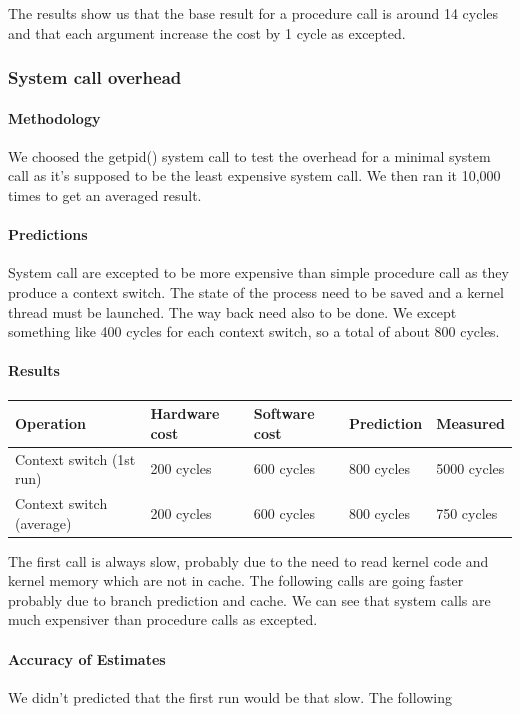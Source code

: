 The results show us that the base result for a procedure call is around 14
cycles and that each argument increase the cost by 1 cycle as excepted.

\subsubsection{System call overhead}
\paragraph{Methodology}
We choosed the getpid() system call to test the overhead for a minimal system
call as it's supposed to be the least expensive system call.
We then ran it 10,000 times to get an averaged result.

\paragraph{Predictions}
System call are excepted to be more expensive than simple procedure call as they
produce a context switch.
The state of the process need to be saved and a kernel thread must be launched.
The way back need also to be done.
We except something like 400 cycles for each context switch, so a total of about 800 cycles.

\paragraph{Results}

\begin{center}
\begin{tabular}{| l | l | l | l | l |}
\hline
Operation & Hardware cost & Software cost & Prediction & Measured \\
\hline
Context switch (1st run) & 200 cycles & 600 cycles & 800 cycles & 5000 cycles\\
\hline
Context switch (average) & 200 cycles & 600 cycles & 800 cycles & 750 cycles\\
\hline
\end{tabular}
\end{center}

The first call is always slow, probably due to the need to read kernel code and
kernel memory which are not in cache.
The following calls are going faster probably due to branch prediction and
cache.
We can see that system calls are much expensiver than procedure calls as
excepted.

\paragraph{Accuracy of Estimates}
We didn't predicted that the first run would be that slow.
The following

